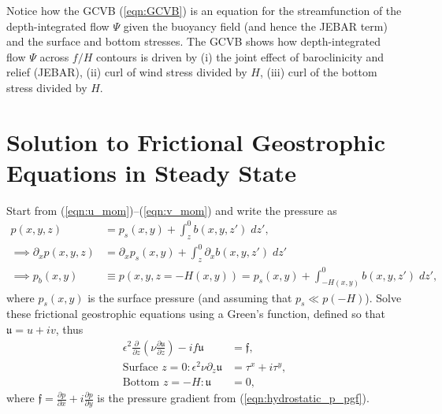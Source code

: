 \documentclass[10pt]{amsart}
\begin{document}
Notice how the GCVB (\ref{eqn:GCVB}) is an equation for the streamfunction of the depth-integrated flow $\Psi$ given the buoyancy field (and hence the JEBAR term) and the surface and bottom stresses.
The GCVB shows how depth-integrated flow $\Psi$ across $f/H$ contours is driven by (i) the joint effect of baroclinicity and relief (JEBAR), (ii) curl of wind stress divided by $H$, (iii) curl of the bottom stress divided by $H$.

\section{Solution to Frictional Geostrophic Equations in Steady State}
Start from (\ref{eqn:u_mom})--(\ref{eqn:v_mom}) and write the pressure as
\begin{align}
p(x,y,z) & = p_s(x,y) + \int_{z}^{0} b(x,y,z') \; dz' , \label{eqn:hydrostatic_p} \\
\implies \partial_x p(x,y,z) & = \partial_x p_s (x, y) + \int_{z}^{0} \partial_x b(x,y,z') \; dz'  \label{eqn:hydrostatic_p_pgf} \\
\implies p_b(x, y) & \equiv p(x, y, z=-H(x,y)) = p_s(x,y) + \int_{-H(x,y)}^{0} b(x,y,z') \; dz' , \label{eqn:pb} 
\end{align}
where $p_s(x,y)$ is the surface pressure (and assuming that $p_s \ll p(-H)$).
Solve these frictional geostrophic equations using a Green's function, defined so that $\mathfrak{u} = u + i v$, thus
\begin{align}
\epsilon^2 \frac{\partial}{\partial z} \left( \nu  \frac{\partial \mathfrak{u}}{\partial z} \right)  - i f  \mathfrak{u} & = \mathfrak{f} ,  \\
\text{Surface~}z = 0:
\epsilon^2 \nu \partial_z \mathfrak{u} & = \tau^x + i \tau^y , \label{eqn:sfc_bcs}
 \\
\text{Bottom~}z = -H:
\mathfrak{u} & = 0 ,
\end{align}
where $\mathfrak{f} = \frac{\partial p}{\partial x} +  i \frac{\partial p}{\partial y}$ is the pressure gradient from (\ref{eqn:hydrostatic_p_pgf}).
\end{document}
